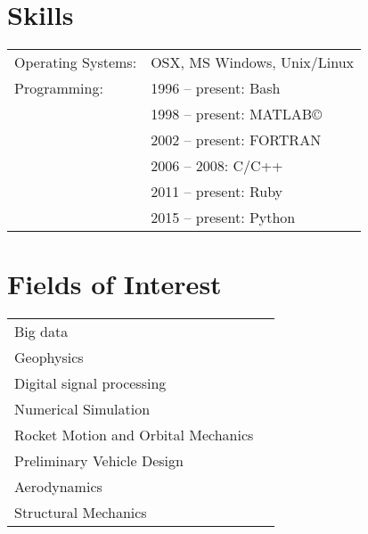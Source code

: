 \documentclass[a4paper]{article}
\newlength{\listskipbig}
\newenvironment{cvsection}[2]{
  \vspace{0.15in}
  \section*{#1}
  \vspace{-0.2in}
  \begin{longtable}{lp{#2}}
}{
  \end{longtable}
}
\begin{document}
\begin{cvsection}{Skills}{11.2cm}
Operating Systems: & OSX, MS Windows, Unix/Linux \\[\listskipbig]

Programming:
& 1996 -- present: Bash \\
& 1998 -- present: MATLAB\copyright  \\
& 2002 -- present: FORTRAN \\
& 2006 -- 2008: C/C++ \\
& 2011 -- present: Ruby \\
& 2015 -- present: Python\\[\listskipbig]
\end{cvsection}


\begin{cvsection}{Fields of Interest}{10cm}
 Big data & \\
 Geophysics & \\
 Digital signal processing & \\
 Numerical Simulation & \\
 Rocket Motion and Orbital Mechanics & \\
 Preliminary Vehicle Design & \\
 Aerodynamics & \\
 Structural Mechanics & \\
\end{cvsection}


\end{document}
